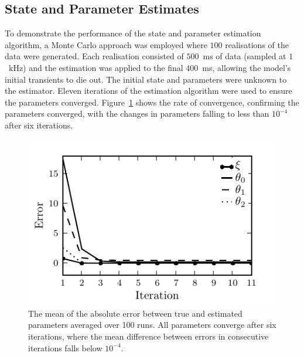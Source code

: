 \documentclass[10pt]{article}
\begin{document}

\subsection*{State and Parameter Estimates} 
\label{sec:state_and_param_results}
To demonstrate the performance of the state and parameter estimation algorithm, a Monte Carlo approach was employed where $100$ realisations of the data were generated. Each realisation consisted of $500$~ms of data (sampled at $1$~kHz) and the estimation was applied to the final $400$~ms, allowing the model's initial transients to die out. The initial state and parameters were unknown to the estimator. Eleven iterations of the estimation algorithm were used to ensure the parameters  converged. Figure~\ref{fig:ParametersConvergence} shows the rate of convergence, confirming the parameters converged, with the changes in parameters falling to less than $10^{-4}$ after six iterations.
\begin{figure}
        \centering
\includegraphics{./Graph/convergence.pdf}
\caption{The mean of the absolute error between true and estimated parameters averaged over 100 runs. All parameters converge after six iterations, where the mean difference between errors in consecutive iterations falls below $10^{-4}$.}
\label{fig:ParametersConvergence}
\end{figure}
\end{document}

